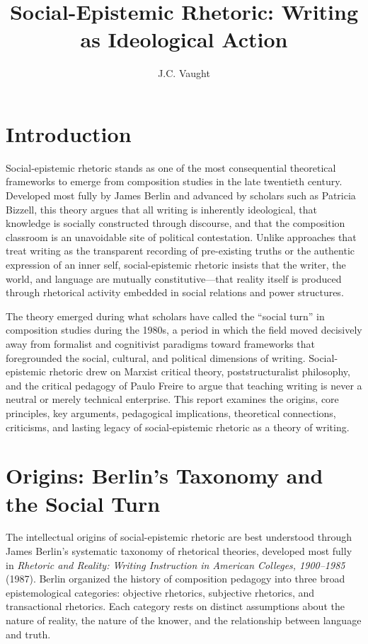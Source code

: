\documentclass[12pt]{article}
\title{Social-Epistemic Rhetoric: Writing as Ideological Action}
\author{J.C. Vaught}
\date{}
\begin{document}
\maketitle

\section*{Introduction}

Social-epistemic rhetoric stands as one of the most consequential theoretical frameworks to emerge from composition studies in the late twentieth century. Developed most fully by James Berlin and advanced by scholars such as Patricia Bizzell, this theory argues that all writing is inherently ideological, that knowledge is socially constructed through discourse, and that the composition classroom is an unavoidable site of political contestation. Unlike approaches that treat writing as the transparent recording of pre-existing truths or the authentic expression of an inner self, social-epistemic rhetoric insists that the writer, the world, and language are mutually constitutive---that reality itself is produced through rhetorical activity embedded in social relations and power structures.

The theory emerged during what scholars have called the ``social turn'' in composition studies during the 1980s, a period in which the field moved decisively away from formalist and cognitivist paradigms toward frameworks that foregrounded the social, cultural, and political dimensions of writing. Social-epistemic rhetoric drew on Marxist critical theory, poststructuralist philosophy, and the critical pedagogy of Paulo Freire to argue that teaching writing is never a neutral or merely technical enterprise. This report examines the origins, core principles, key arguments, pedagogical implications, theoretical connections, criticisms, and lasting legacy of social-epistemic rhetoric as a theory of writing.

\section{Origins: Berlin's Taxonomy and the Social Turn}

The intellectual origins of social-epistemic rhetoric are best understood through James Berlin's systematic taxonomy of rhetorical theories, developed most fully in \textit{Rhetoric and Reality: Writing Instruction in American Colleges, 1900--1985} (1987). Berlin organized the history of composition pedagogy into three broad epistemological categories: objective rhetorics, subjective rhetorics, and transactional rhetorics. Each category rests on distinct assumptions about the nature of reality, the nature of the knower, and the relationship between language and truth.
\end{document}
